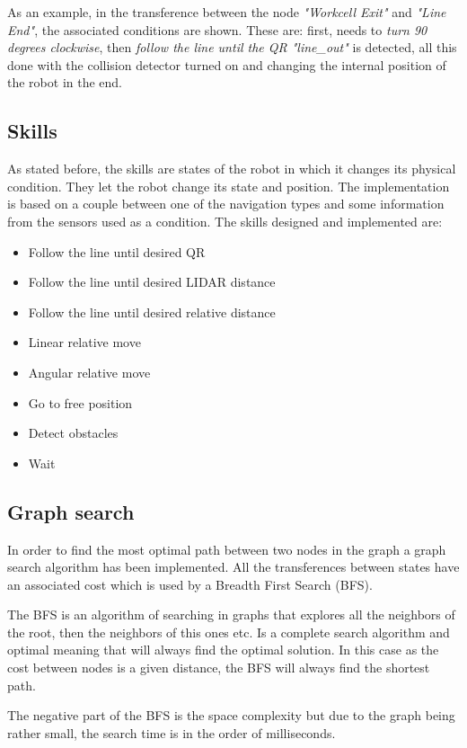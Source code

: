     As an example, in the transference between the node \emph{"Workcell Exit"} and \emph{"Line End"}, the associated conditions are shown. 
    These are: first, needs to \emph{turn 90 degrees clockwise}, then \emph{follow the line until the QR "line\_out"} is detected, all this done with the collision detector turned on and changing the internal position of the robot in the end.

    \subsection{Skills} %
    \label{sub:skills}
    As stated before, the skills are states of the robot in which it changes its physical condition.
    They let the robot change its state and position.
    The implementation is based on a couple between one of the navigation types and some information from the sensors used as a condition.
    The skills designed and implemented are:
    \begin{itemize}
        \item Follow the line until desired QR
        \item Follow the line until desired LIDAR distance
        \item Follow the line until desired relative distance
        \item Linear relative move
        \item Angular relative move
        \item Go to free position
        \item Detect obstacles
        \item Wait
    \end{itemize}

    \subsection{Graph search} %
    \label{sub:mr_graph_search}
    In order to find the most optimal path between two nodes in the graph a graph search algorithm has been implemented.
    All the transferences between states have an associated cost which is used by a Breadth First Search (BFS).

    The BFS is an algorithm of searching in graphs that explores all the neighbors of the root, then the neighbors of this ones etc.
    Is a complete search algorithm and optimal meaning that will always find the optimal solution.
    In this case as the cost between nodes is a given distance, the BFS will always find the shortest path.
    
    The negative part of the BFS is the space complexity but due to the graph being rather small, the search time is in the order of milliseconds.
